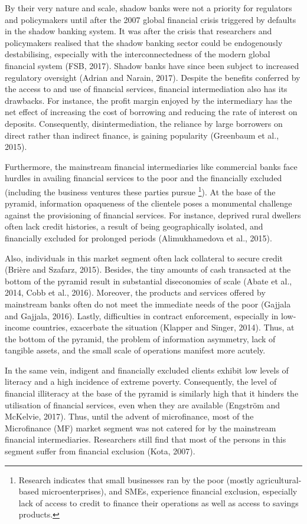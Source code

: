 \documentclass[a4paper, nobind]{templates/ociamthesis}
\begin{document}
By their very nature and scale, shadow banks were not a priority for regulators and policymakers until after the 2007 global financial crisis triggered by defaults in the shadow banking system. It was after the crisis that researchers and policymakers realised that the shadow banking sector could be endogenously destabilising, especially with the interconnectedness of the modern global financial system (FSB, 2017). Shadow banks have since been subject to increased regulatory oversight (Adrian and Narain, 2017).
Despite the benefits conferred by the access to and use of financial services, financial intermediation also has its drawbacks. For instance, the profit margin enjoyed by the intermediary has the net effect of increasing the cost of borrowing and reducing the rate of interest on deposits. Consequently, disintermediation, the reliance by large borrowers on direct rather than indirect finance, is gaining popularity (Greenbaum et al., 2015).

Furthermore, the mainstream financial intermediaries like commercial banks face hurdles in availing financial services to the poor and the financially excluded (including the business ventures these parties pursue \footnote{Research indicates that small businesses ran by the poor (mostly agricultural-based microenterprises), and SMEs, experience financial exclusion, especially lack of access to credit to finance their operations as well as access to savings products.}). At the base of the pyramid, information opaqueness of the clientele poses a monumental challenge against the provisioning of financial services. For instance, deprived rural dwellers often lack credit histories, a result of being geographically isolated, and financially excluded for prolonged periods (Alimukhamedova et al., 2015).

Also, individuals in this market segment often lack collateral to secure credit (Brière and Szafarz, 2015). Besides, the tiny amounts of cash transacted at the bottom of the pyramid result in substantial diseconomies of scale (Abate et al., 2014, Cobb et al., 2016). Moreover, the products and services offered by mainstream banks often do not meet the immediate needs of the poor (Gajjala and Gajjala, 2016). Lastly, difficulties in contract enforcement, especially in low-income countries, exacerbate the situation (Klapper and Singer, 2014). Thus, at the bottom of the pyramid, the problem of information asymmetry, lack of tangible assets, and the small scale of operations manifest more acutely.

In the same vein, indigent and financially excluded clients exhibit low levels of literacy and a high incidence of extreme poverty. Consequently, the level of financial illiteracy at the base of the pyramid is similarly high that it hinders the utilisation of financial services, even when they are available (Engström and McKelvie, 2017). Thus, until the advent of microfinance, most of the Microfinance (MF) market segment was not catered for by the mainstream financial intermediaries. Researchers still find that most of the persons in this segment suffer from financial exclusion (Kota, 2007).
\end{document}
